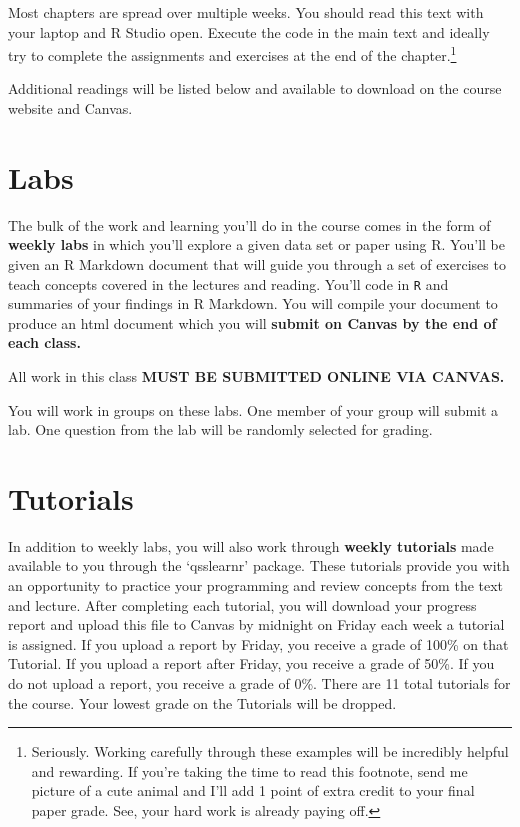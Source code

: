 
Most chapters are spread over multiple weeks. You should read this text with your laptop and R Studio open. Execute the code in the main text and ideally try to complete the assignments and exercises at the end of the chapter.\footnote{Seriously. Working carefully through these examples will be incredibly helpful and rewarding. If you're taking the time to read this footnote, send me picture of a cute animal and I'll add 1 point of extra credit to your final paper grade. See, your hard work is already paying off.} 

Additional readings will be listed below and available to download on the course website and Canvas. 


\section{Labs}

The bulk of the work and learning you'll do in the course comes in the form of \textbf{weekly labs} in which you'll explore a given data set or paper using R. You'll be given an R Markdown document that will guide you through a set of exercises to teach concepts covered in the lectures and reading. You'll code in \texttt{R} and summaries of your findings in R Markdown. You will compile your document to produce an html document which you will \textbf{submit on Canvas by the end of each class.}

All work in this class \textbf{MUST BE SUBMITTED ONLINE VIA CANVAS.}

You will work in groups on these labs. One member of your group will submit a lab. One question from the lab will be randomly selected for grading. 

\section{Tutorials}

In addition to weekly labs, you will also work through \textbf{weekly tutorials} made available to you through the `qsslearnr' package. These tutorials provide you with an opportunity to practice your programming and review concepts from the text and lecture. After completing each tutorial, you will download your progress report and upload this file to Canvas by midnight on Friday each week a tutorial is assigned. If you upload a report by Friday, you receive a grade of 100\% on that Tutorial. If you upload a report after Friday, you receive a grade of 50\%. If you do not upload a report, you receive a grade of 0\%. There are 11 total tutorials for the course. Your lowest grade on the Tutorials will be dropped.

